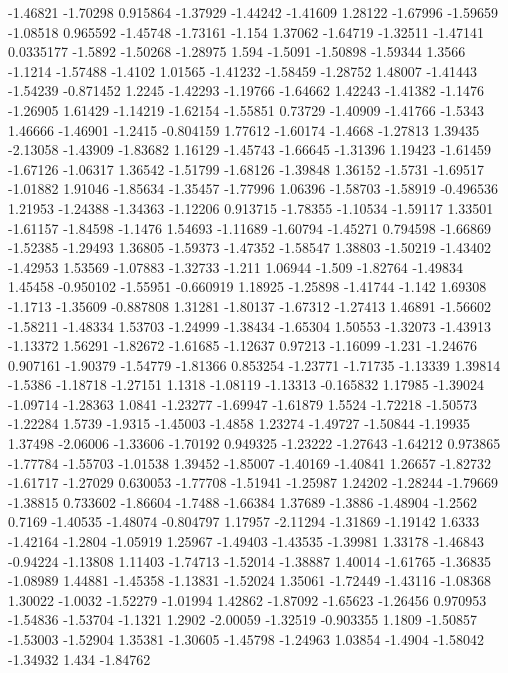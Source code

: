 \documentclass[9pt]{article}
\theoremstyle{plain}
\theoremstyle{definition}
\theoremstyle{remark}
\numberwithin{equation}{section}
\begin{document}
-1.46821
-1.70298
0.915864
-1.37929
-1.44242
-1.41609
1.28122
-1.67996
-1.59659
-1.08518
0.965592
-1.45748
-1.73161
-1.154
1.37062
-1.64719
-1.32511
-1.47141
0.0335177
-1.5892
-1.50268
-1.28975
1.594
-1.5091
-1.50898
-1.59344
1.3566
-1.1214
-1.57488
-1.4102
1.01565
-1.41232
-1.58459
-1.28752
1.48007
-1.41443
-1.54239
-0.871452
1.2245
-1.42293
-1.19766
-1.64662
1.42243
-1.41382
-1.1476
-1.26905
1.61429
-1.14219
-1.62154
-1.55851
0.73729
-1.40909
-1.41766
-1.5343
1.46666
-1.46901
-1.2415
-0.804159
1.77612
-1.60174
-1.4668
-1.27813
1.39435
-2.13058
-1.43909
-1.83682
1.16129
-1.45743
-1.66645
-1.31396
1.19423
-1.61459
-1.67126
-1.06317
1.36542
-1.51799
-1.68126
-1.39848
1.36152
-1.5731
-1.69517
-1.01882
1.91046
-1.85634
-1.35457
-1.77996
1.06396
-1.58703
-1.58919
-0.496536
1.21953
-1.24388
-1.34363
-1.12206
0.913715
-1.78355
-1.10534
-1.59117
1.33501
-1.61157
-1.84598
-1.1476
1.54693
-1.11689
-1.60794
-1.45271
0.794598
-1.66869
-1.52385
-1.29493
1.36805
-1.59373
-1.47352
-1.58547
1.38803
-1.50219
-1.43402
-1.42953
1.53569
-1.07883
-1.32733
-1.211
1.06944
-1.509
-1.82764
-1.49834
1.45458
-0.950102
-1.55951
-0.660919
1.18925
-1.25898
-1.41744
-1.142
1.69308
-1.1713
-1.35609
-0.887808
1.31281
-1.80137
-1.67312
-1.27413
1.46891
-1.56602
-1.58211
-1.48334
1.53703
-1.24999
-1.38434
-1.65304
1.50553
-1.32073
-1.43913
-1.13372
1.56291
-1.82672
-1.61685
-1.12637
0.97213
-1.16099
-1.231
-1.24676
0.907161
-1.90379
-1.54779
-1.81366
0.853254
-1.23771
-1.71735
-1.13339
1.39814
-1.5386
-1.18718
-1.27151
1.1318
-1.08119
-1.13313
-0.165832
1.17985
-1.39024
-1.09714
-1.28363
1.0841
-1.23277
-1.69947
-1.61879
1.5524
-1.72218
-1.50573
-1.22284
1.5739
-1.9315
-1.45003
-1.4858
1.23274
-1.49727
-1.50844
-1.19935
1.37498
-2.06006
-1.33606
-1.70192
0.949325
-1.23222
-1.27643
-1.64212
0.973865
-1.77784
-1.55703
-1.01538
1.39452
-1.85007
-1.40169
-1.40841
1.26657
-1.82732
-1.61717
-1.27029
0.630053
-1.77708
-1.51941
-1.25987
1.24202
-1.28244
-1.79669
-1.38815
0.733602
-1.86604
-1.7488
-1.66384
1.37689
-1.3886
-1.48904
-1.2562
0.7169
-1.40535
-1.48074
-0.804797
1.17957
-2.11294
-1.31869
-1.19142
1.6333
-1.42164
-1.2804
-1.05919
1.25967
-1.49403
-1.43535
-1.39981
1.33178
-1.46843
-0.94224
-1.13808
1.11403
-1.74713
-1.52014
-1.38887
1.40014
-1.61765
-1.36835
-1.08989
1.44881
-1.45358
-1.13831
-1.52024
1.35061
-1.72449
-1.43116
-1.08368
1.30022
-1.0032
-1.52279
-1.01994
1.42862
-1.87092
-1.65623
-1.26456
0.970953
-1.54836
-1.53704
-1.1321
1.2902
-2.00059
-1.32519
-0.903355
1.1809
-1.50857
-1.53003
-1.52904
1.35381
-1.30605
-1.45798
-1.24963
1.03854
-1.4904
-1.58042
-1.34932
1.434
-1.84762
\end{document}
